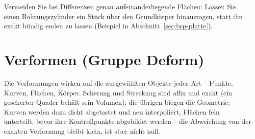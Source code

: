 \begin{tipp}
Vermeiden Sie bei Differenzen genau aufeinanderliegende Flächen: Lassen Sie einen
Bohrungszylinder ein Stück über den Grundkörper hinausragen, statt ihn exakt bündig enden zu
lassen (Beispiel in Abschnitt~\ref{sec:bsp-platte}).
\end{tipp}

\section{Verformen (Gruppe Deform)}\label{sec:gruppe-deform}

Die Verformungen wirken auf die ausgewählten Objekte jeder Art -- Punkte, Kurven, Flächen,
Körper. Scherung und Streckung sind affin und exakt (ein gescherter Quader behält sein Volumen);
die übrigen biegen die Geometrie: Kurven werden dazu dicht abgetastet und neu interpoliert, Flächen
fein unterteilt, bevor ihre Kontrollpunkte abgebildet werden -- die Abweichung von der exakten
Verformung bleibt klein, ist aber nicht null.
